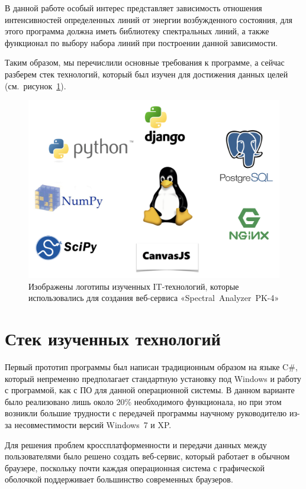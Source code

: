 В данной работе особый интерес представляет зависимость отношения интенсивностей определенных линий от энергии
возбужденного состояния, для этого программа должна иметь библиотеку спектральных линий, а также функционал
по выбору набора линий при построении данной зависимости.

Таким образом, мы перечислили основные требования к программе, а сейчас разберем стек технологий,
который был изучен для достижения данных целей (см.~рисунок~\ref{fig:it_tech}).
\begin{figure}[t]
  \centering
  \includegraphics[width=12cm]{figures/it_tech}
  \caption{Изображены логотипы изученных IT-технологий, которые использовались для создания веб-сервиса «Spectral~Analyzer~PK-4»}
  \label{fig:it_tech}
\end{figure}

\section{Стек изученных технологий}
Первый прототип программы был написан традиционным образом на языке C\#, который непременно предполагает
стандартную установку под Windows и работу с программой, как с ПО для данной операционной системы.
В данном варианте было реализовано лишь около 20\% необходимого функционала, но при этом возникли большие трудности
с передачей программы научному руководителю из-за несовместимости версий Windows~7 и XP.

Для решения проблем кроссплатформенности и передачи данных между пользователями было решено создать веб-сервис,
который работает в обычном браузере, поскольку почти каждая операционная система с графической оболочкой
поддерживает большинство современных браузеров.

